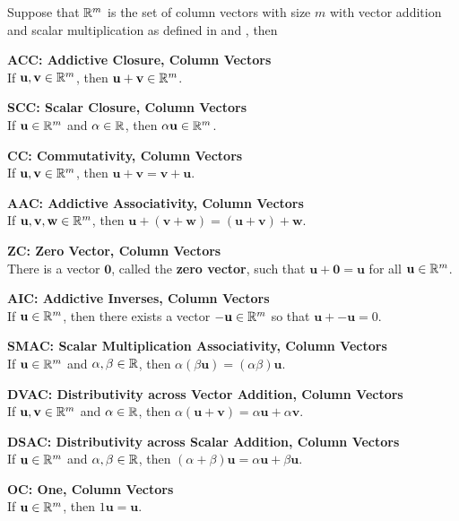\documentclass[a4paper,12pt]{article}
\begin{document}
\begin{pst}
  Suppose that $\mathbb{R}^{m}$ is the set of column vectors with size $m$ with vector addition and scalar multiplication as defined in \rdft[\sctr{2}] and \rdft[\sctr{1}], then

  \begin{alist}
    \item \textbf{ACC: Addictive Closure, Column Vectors}\\
    If $\mathbf{u},\mathbf{v}\in\mathbb{R}^{m}$, then $\mathbf{u}+\mathbf{v}\in\mathbb{R}^{m}$.
    \item \textbf{SCC: Scalar Closure, Column Vectors}\\
    If $\mathbf{u}\in\mathbb{R}^{m}$ and $\alpha\in\mathbb{R}$, then $\alpha\mathbf{u}\in\mathbb{R}^{m}$.
    \item \textbf{CC: Commutativity, Column Vectors}\\
    If $\mathbf{u},\mathbf{v}\in\mathbb{R}^{m}$, then $\mathbf{u}+\mathbf{v}=\mathbf{v}+\mathbf{u}$.
    \item \textbf{AAC: Addictive Associativity, Column Vectors}\\
    If $\mathbf{u},\mathbf{v},\mathbf{w}\in\mathbb{R}^{m}$, then $\mathbf{u}+(\mathbf{v}+\mathbf{w})=(\mathbf{u}+\mathbf{v})+\mathbf{w}$.
    \item \textbf{ZC: Zero Vector, Column Vectors}\\
    There is a vector $\mathbf{0}$, called the \textbf{zero vector}, such that $\mathbf{u}+\mathbf{0}=\mathbf{u}$ for all $\mathbf{u}\in\mathbb{R}^{m}$.
    \item \textbf{AIC: Addictive Inverses, Column Vectors}\\
    If $\mathbf{u}\in\mathbb{R}^{m}$, then there exists a vector $-\mathbf{u}\in\mathbb{R}^{m}$ so that $\mathbf{u}+\mathbf{-u}=0$.
    \item \textbf{SMAC: Scalar Multiplication Associativity, Column Vectors}\\
    If $\mathbf{u}\in\mathbb{R}^{m}$ and $\alpha,\beta\in\mathbb{R}$, then $\alpha(\beta\mathbf{u})=(\alpha\beta)\mathbf{u}$.
    \item \textbf{DVAC: Distributivity across Vector Addition, Column Vectors}\\
    If $\mathbf{u},\mathbf{v}\in\mathbb{R}^{m}$ and $\alpha\in\mathbb{R}$, then $\alpha(\mathbf{u}+\mathbf{v})=\alpha\mathbf{u}+\alpha\mathbf{v}$.
    \item \textbf{DSAC: Distributivity across Scalar Addition, Column Vectors}\\
    If $\mathbf{u}\in\mathbb{R}^{m}$ and $\alpha,\beta\in\mathbb{R}$, then $(\alpha+\beta)\mathbf{u}=\alpha\mathbf{u}+\beta\mathbf{u}$.
    \item \textbf{OC: One, Column Vectors}\\
    If $\mathbf{u}\in\mathbb{R}^{m}$, then $1\mathbf{u}=\mathbf{u}$.
  \end{alist}
\end{pst}
\end{document}
